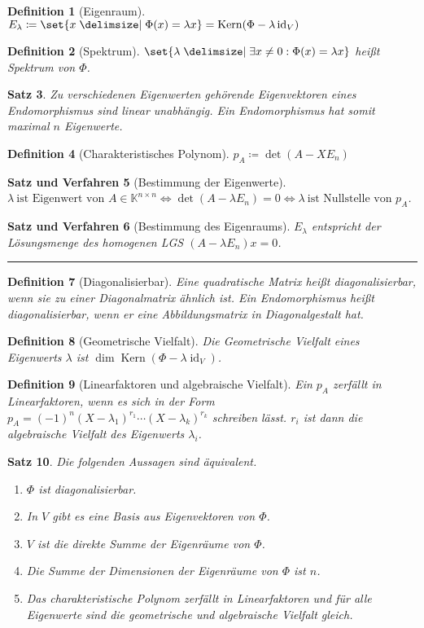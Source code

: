 \documentclass[a4paper]{article}
\newcounter{Sec}
\theoremstyle{marginbreak}
\newtheorem{definition}{Definition}[Sec]
\newtheorem{satz}[definition]{Satz}
\newtheorem{satzver}[definition]{Satz und Verfahren}
\DeclareMathOperator{\Kern}{Kern}
\DeclareMathOperator{\id}{id}
\newcommand{\sep}{%
	\rule{\textwidth}{0.3pt}%
	\stepcounter{Sec}%
	}
\begin{document}
	\begin{definition}[Eigenraum]
		$E_\lambda\coloneqq\set{x\given\Phi(x)=\lambda x}=\Kern(\Phi-\lambda\id_V)$
	\end{definition}
	\begin{definition}[Spektrum]
		$\set{\lambda\given\exists x\neq0:\Phi(x)=\lambda x}$ heißt Spektrum von $\Phi$.
	\end{definition}
	\begin{satz}
		Zu verschiedenen Eigenwerten gehörende Eigenvektoren eines Endomorphismus sind linear unabhängig.
		Ein Endomorphismus hat somit maximal $n$ Eigenwerte.
	\end{satz}
	\begin{definition}[Charakteristisches Polynom]
		$p_A\coloneqq\det(A-XE_n)$
	\end{definition}
	\begin{satzver}[Bestimmung der Eigenwerte]
		$\lambda~\text{ist Eigenwert von $A \in\mathbb{K}^{n\times n}$} \iff \det(A-\lambda E_n) = 0 \iff \lambda~\text{ist Nullstelle von $p_A$}$.
	\end{satzver}
	\begin{satzver}[Bestimmung des Eigenraums]
		$E_\lambda$ entspricht der Lösungsmenge des homogenen LGS $(A-\lambda E_n)x = 0$.
	\end{satzver}
	\sep
	\begin{definition}[Diagonalisierbar]
		Eine quadratische Matrix heißt diagonalisierbar, wenn sie zu einer Diagonalmatrix
		ähnlich ist. Ein Endomorphismus heißt diagonalisierbar, wenn er eine Abbildungsmatrix
		in Diagonalgestalt hat.
	\end{definition}
	\begin{definition}[Geometrische Vielfalt]
		Die Geometrische Vielfalt eines Eigenwerts $\lambda$ ist $\dim\Kern(\Phi-\lambda\id_V)$.
	\end{definition}
	\begin{definition}[Linearfaktoren und algebraische Vielfalt]
		Ein $p_A$ zerfällt in Linearfaktoren, wenn es sich
		in der Form $p_A=(-1)^n(X-\lambda_1)^{r_1}\cdots(X-\lambda_k)^{r_k}$ schreiben
		lässt. $r_i$ ist dann die algebraische Vielfalt des Eigenwerts $\lambda_i$.
	\end{definition}
	\begin{satz}
		Die folgenden Aussagen sind äquivalent.
		\begin{enumerate}[label=(\alph*)]
			\item $\Phi$ ist diagonalisierbar.
			\item In $V$ gibt es eine Basis aus Eigenvektoren von $\Phi$.
			\item $V$ ist die direkte Summe der Eigenräume von $\Phi$.
			\item Die Summe der Dimensionen der Eigenräume von $\Phi$ ist $n$.
			\item Das charakteristische Polynom zerfällt in Linearfaktoren und
			für alle Eigenwerte sind die geometrische und algebraische Vielfalt gleich.
		\end{enumerate}
	\end{satz}
\end{document}
